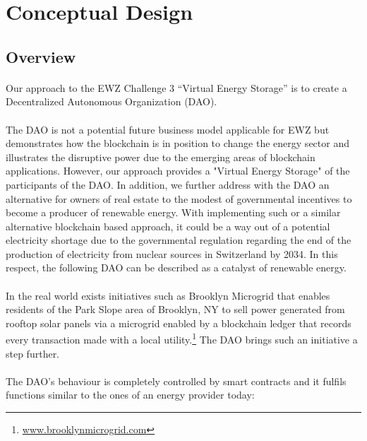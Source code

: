 \documentclass{scrartcl}
\begin{document}
	\section{Conceptual Design}
	
	\subsection{Overview}

    \paragraph{}
    Our approach to the EWZ Challenge 3 “Virtual Energy Storage” is to create a Decentralized Autonomous Organization (DAO). 
    
    \paragraph{}
    The DAO is not a potential future business model applicable for EWZ but demonstrates how the blockchain is in position to change the energy sector and illustrates the disruptive power due to the emerging areas of blockchain applications. However, our approach provides a "Virtual Energy Storage" of the participants of the DAO. In addition, we further address with the DAO an alternative for owners of real estate to the modest of governmental incentives to become a producer of renewable energy. With implementing such or a similar alternative blockchain based approach, it could be a way out of a potential electricity shortage due to the governmental regulation regarding the end of the production of electricity from nuclear sources in Switzerland by 2034. In this respect, the following DAO can be described as a catalyst of renewable energy. 
    
    \paragraph{}
    In the real world exists initiatives such as Brooklyn Microgrid that enables residents of the Park Slope area of Brooklyn, NY to sell power generated from rooftop solar panels via a microgrid enabled by a blockchain ledger that records every transaction made with a local utility.\footnote{\url{www.brooklynmicrogrid.com}} The DAO brings such an initiative a step further.
    
    \paragraph{}
    The DAO's behaviour is completely controlled by smart contracts and it fulfils functions similar to the ones of an energy provider today:
   
\end{document}
